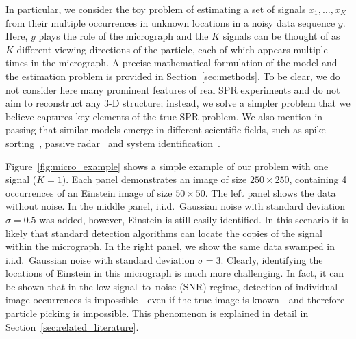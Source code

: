 \documentclass[english,11pt]{article}
\numberwithin{equation}{section}
\theoremstyle{plain}
\theoremstyle{definition}
\theoremstyle{remark}
\theoremstyle{plain}
\theoremstyle{remark}
\theoremstyle{plain}
\theoremstyle{plain}
\newcommand{\SNR}{{\textsf{SNR}}}
\begin{document}
In particular, we consider the toy problem of estimating a set of signals $x_1,\ldots,x_K$ from their multiple occurrences in unknown  locations in a noisy data sequence $y$. Here, $y$ plays the role of the micrograph and the $K$ signals can be thought of as $K$ different viewing directions of the particle, each of which  appears multiple times in the micrograph. 
A precise mathematical formulation of the model and the estimation problem is provided in Section~\ref{sec:methods}.
To be clear, we do not consider here many prominent features of real SPR experiments and do not aim to reconstruct any 3-D structure; instead, we solve a simpler problem that we believe captures key elements of the true SPR problem. We also mention in passing that similar models emerge in different scientific fields, such as spike sorting~\cite{lewicki1998review}, passive radar~\cite{gogineni2017passive} and system identification~\cite{ljung1998system}.

Figure~\ref{fig:micro_example} shows a simple example of our problem with  one signal ($K=1$). 
Each panel demonstrates an image of size $250\times 250$, containing 4 occurrences of an Einstein image of size $50\times 50$. 
The left panel shows the data without noise. In the middle panel,  i.i.d.\ Gaussian noise with standard deviation $\sigma=0.5$  was added, however,  Einstein is still easily identified. In this scenario it is likely that standard detection algorithms can locate the copies of the signal within the micrograph. In the right panel, we show the same data swamped in  
i.i.d.\ Gaussian noise with standard deviation  $\sigma=3$.
Clearly, identifying the locations of Einstein in this micrograph is much more challenging. In fact, it can be shown that in the low signal--to--noise (\SNR) regime, 
detection  of individual image occurrences is impossible---even if the true image is known---and therefore particle picking is impossible.  This phenomenon is explained in detail in Section~\ref{sec:related_literature}.
\end{document}
